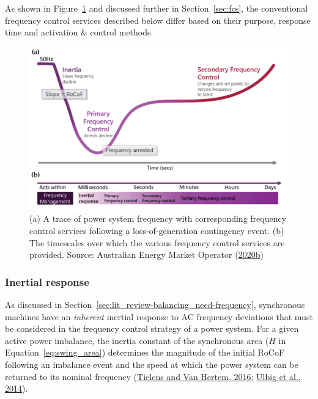 \documentclass[12pt,a4paper,]{report}
\begin{document}
As shown in Figure~\ref{fig:freq_control} and discussed further in
Section~\ref{sec:fcs}, the conventional frequency control services
described below differ based on their purpose, response time and
activation \& control methods.

\begin{figure}
\hypertarget{fig:freq_control}{%
\centering
\includegraphics{source/figures/freq_control_timeframes.png}
\caption[Sequence and timescales of typical frequency control
services]{(a) A trace of power system frequency with corresponding
frequency control services following a loss-of-generation contingency
event. (b) The timescales over which the various frequency control
services are provided. Source: Australian Energy Market Operator
(\protect\hyperlink{ref-australianenergymarketoperatorPowerSystemRequirements2020}{2020b})}\label{fig:freq_control}
}
\end{figure}

\hypertarget{sec:lit_review-balancing_practices-inertial_response}{%
\subsubsection{Inertial
response}\label{sec:lit_review-balancing_practices-inertial_response}}

As discussed in Section~\ref{sec:lit_review-balancing_need-frequency},
synchronous machines have an \emph{inherent} inertial response to AC
frequency deviations that must be considered in the frequency control
strategy of a power system. For a given active power imbalance, the
inertia constant of the synchronous area (\(H\) in
Equation~\ref{eq:swing_area}) determines the magnitude of the initial
RoCoF following an imbalance event and the speed at which the power
system can be returned to its nominal frequency
(\protect\hyperlink{ref-tielensRelevanceInertiaPower2016}{Tielens and
Van Hertem, 2016};
\protect\hyperlink{ref-ulbigImpactLowRotational2014}{Ulbig et al.,
2014}).
\end{document}
